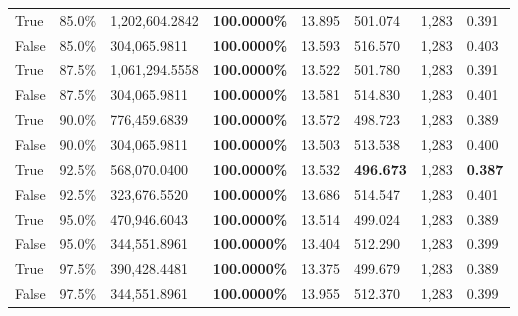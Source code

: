 \begin{table}[H]
\begin{tabular}{lllrllll}
\cline{1-8}
True & 85.0\% & 1,202,604.2842 & \bfseries \color{red} 100.0000\% & 13.895 & 501.074 & 1,283 & 0.391 \\
\cline{1-8}
False & 85.0\% & 304,065.9811 & \bfseries \color{red} 100.0000\% & 13.593 & 516.570 & 1,283 & 0.403 \\
\cline{1-8}
True & 87.5\% & 1,061,294.5558 & \bfseries \color{red} 100.0000\% & 13.522 & 501.780 & 1,283 & 0.391 \\
\cline{1-8}
False & 87.5\% & 304,065.9811 & \bfseries \color{red} 100.0000\% & 13.581 & 514.830 & 1,283 & 0.401 \\
\cline{1-8}
True & 90.0\% & 776,459.6839 & \bfseries \color{red} 100.0000\% & 13.572 & 498.723 & 1,283 & 0.389 \\
\cline{1-8}
False & 90.0\% & 304,065.9811 & \bfseries \color{red} 100.0000\% & 13.503 & 513.538 & 1,283 & 0.400 \\
\cline{1-8}
True & 92.5\% & 568,070.0400 & \bfseries \color{red} 100.0000\% & 13.532 & \bfseries \color{red} 496.673 & 1,283 & \bfseries \color{red} 0.387 \\
\cline{1-8}
False & 92.5\% & 323,676.5520 & \bfseries \color{red} 100.0000\% & 13.686 & 514.547 & 1,283 & 0.401 \\
\cline{1-8}
True & 95.0\% & 470,946.6043 & \bfseries \color{red} 100.0000\% & 13.514 & 499.024 & 1,283 & 0.389 \\
\cline{1-8}
False & 95.0\% & 344,551.8961 & \bfseries \color{red} 100.0000\% & 13.404 & 512.290 & 1,283 & 0.399 \\
\cline{1-8}
True & 97.5\% & 390,428.4481 & \bfseries \color{red} 100.0000\% & 13.375 & 499.679 & 1,283 & 0.389 \\
\cline{1-8}
False & 97.5\% & 344,551.8961 & \bfseries \color{red} 100.0000\% & 13.955 & 512.370 & 1,283 & 0.399 \\
\cline{1-8}
\bottomrule
\end{tabular}
\end{table}
